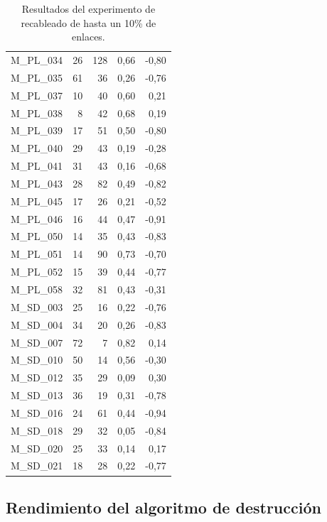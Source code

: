 \begin{table}[ht!]
\begin{tabular}{lrrrr}
    M\_PL\_034 & 26   & 128  & 0,66 & -0,80 \\
    M\_PL\_035 & 61   & 36   & 0,26 & -0,76 \\
    M\_PL\_037 & 10   & 40   & 0,60 & 0,21 \\
    M\_PL\_038 & 8    & 42   & 0,68 & 0,19 \\
    M\_PL\_039 & 17   & 51   & 0,50 & -0,80 \\
    M\_PL\_040 & 29   & 43   & 0,19 & -0,28 \\
    M\_PL\_041 & 31   & 43   & 0,16 & -0,68 \\
    M\_PL\_043 & 28   & 82   & 0,49 & -0,82 \\
    M\_PL\_045 & 17   & 26   & 0,21 & -0,52 \\
    M\_PL\_046 & 16   & 44   & 0,47 & -0,91 \\
    M\_PL\_050 & 14   & 35   & 0,43 & -0,83 \\
    M\_PL\_051 & 14   & 90   & 0,73 & -0,70 \\
    M\_PL\_052 & 15   & 39   & 0,44 & -0,77 \\
    M\_PL\_058 & 32   & 81   & 0,43 & -0,31 \\
    M\_SD\_003 & 25   & 16   & 0,22 & -0,76 \\
    M\_SD\_004 & 34   & 20   & 0,26 & -0,83 \\
    M\_SD\_007 & 72   & 7    & 0,82 & 0,14 \\
    M\_SD\_010 & 50   & 14   & 0,56 & -0,30 \\
    M\_SD\_012 & 35   & 29   & 0,09 & 0,30 \\
    M\_SD\_013 & 36   & 19   & 0,31 & -0,78 \\
    M\_SD\_016 & 24   & 61   & 0,44 & -0,94 \\
    M\_SD\_018 & 29   & 32   & 0,05 & -0,84 \\
    M\_SD\_020 & 25   & 33   & 0,14 & 0,17 \\
    M\_SD\_021 & 18   & 28   & 0,22 & -0,77 \\
    \bottomrule
    \end{tabular}%
  \caption{\label{table:table_rewiring} Resultados del experimento de recableado de hasta un 10\% de enlaces.}
\end{table}%


\subsection{Rendimiento del algoritmo de destrucción}

